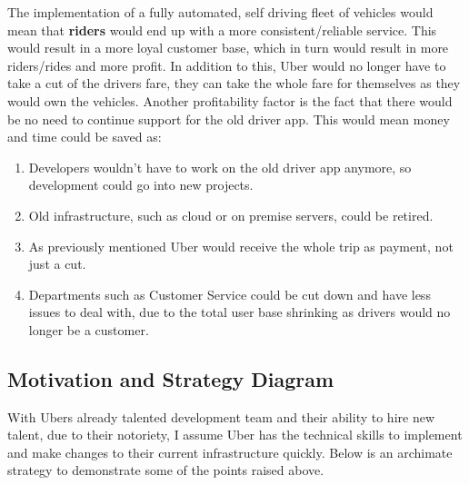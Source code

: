\documentclass{article}
\begin{document}
    The implementation of a fully automated, self driving fleet of vehicles would mean that \textbf{riders} would end up 
    with a more consistent/reliable service. This would result in a more loyal customer base, which in turn would result in
    more riders/rides and more profit. In addition to this, Uber would no longer have to take a cut of the drivers fare, they
    can take the whole fare for themselves as they would own the vehicles. Another profitability factor is the fact that there
    would be no need to continue support for the old driver app. This would mean money and time could be saved as:

    \begin{enumerate}
      \item Developers wouldn't have to work on the old driver app anymore, so development could go into new projects.
      \item Old infrastructure, such as cloud or on premise servers, could be retired.
      \item As previously mentioned Uber would receive the whole trip as payment, not just a cut.
      \item Departments such as Customer Service could be cut down and have less issues to deal with, due to the total user base shrinking as drivers would no longer be a customer.
    \end{enumerate} 

    \newpage
    \subsection{Motivation and Strategy Diagram}

    \noindent  With Ubers already talented development team and their ability to hire new talent, due to their notoriety, I assume Uber has 
    the technical skills to implement and make changes to their current infrastructure quickly. Below is an archimate strategy to demonstrate some of
    the points raised above. 
\end{document}
